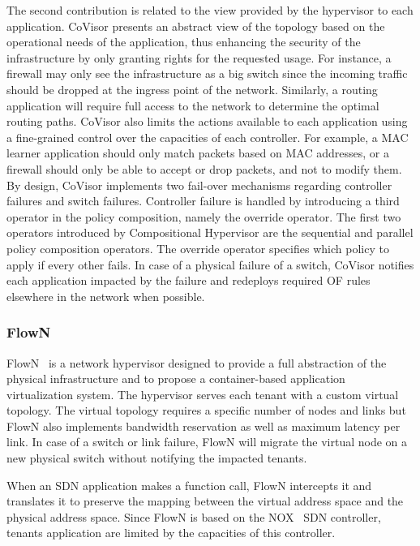 The second contribution is related to the view provided by the hypervisor to each application.
CoVisor presents an abstract view of the topology based on the operational needs of the application, thus enhancing the security of the infrastructure by only granting rights for the requested usage. 
For instance, a firewall may only see the infrastructure as a big switch since the incoming traffic should be dropped at the ingress point of the network.
Similarly, a routing application will require full access to the network to determine the optimal routing paths.
CoVisor also limits the actions available to each application using a fine-grained control over the capacities of each controller.
For example, a MAC learner application should only match packets based on MAC addresses, or a firewall should only be able to accept or drop packets, and not to modify them.
By design, CoVisor implements two fail-over mechanisms regarding controller failures and switch failures.
Controller failure is handled by introducing a third operator in the policy composition, namely the override operator. The first two operators introduced by Compositional Hypervisor are the sequential and parallel policy composition operators. The override operator specifies which policy to apply if every other fails.
In case of a physical failure of a switch, CoVisor notifies each application impacted by the failure and redeploys required OF rules elsewhere in the network when possible.


\subsubsection{FlowN}
FlowN~\cite{FlowN-Drutskoy2012} is a network hypervisor designed to provide a full abstraction of the physical infrastructure and to propose a container-based application virtualization system. 
The hypervisor serves each tenant with a custom virtual topology. The virtual topology requires a specific number of nodes and links but FlowN also implements bandwidth reservation as well as maximum latency per link. 
In case of a switch or link failure, FlowN will migrate the virtual node on a new physical switch without notifying the impacted tenants.

When an SDN application makes a function call, FlowN intercepts it and translates it to preserve the mapping between the virtual address space and the physical address space. Since FlowN is based on the NOX~\cite{nox-gude2008} SDN controller, tenants application are limited by the capacities of this controller. 

